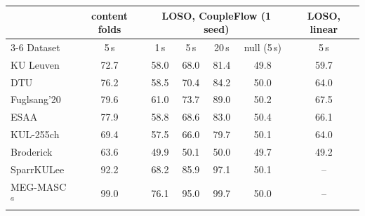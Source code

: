 \begin{tabular}{lcccccc}\toprule
& content folds & \multicolumn{4}{c}{LOSO, CoupleFlow (1 seed)} & LOSO, linear \\
\cmidrule(lr){3-6}
Dataset & 5\,s & 1\,s & 5\,s & 20\,s & null (5\,s) & 5\,s \\\midrule
KU Leuven & 72.7 & 58.0 & 68.0 & 81.4 & 49.8 & 59.7 \\
DTU & 76.2 & 58.5 & 70.4 & 84.2 & 50.0 & 64.0 \\
Fuglsang'20 & 79.6 & 61.0 & 73.7 & 89.0 & 50.2 & 67.5 \\
ESAA & 77.9 & 58.8 & 68.6 & 83.0 & 50.4 & 66.1 \\
KUL-255ch & 69.4 & 57.5 & 66.0 & 79.7 & 50.1 & 64.0 \\
Broderick & 63.6 & 49.9 & 50.1 & 50.0 & 49.7 & 49.2 \\
SparrKULee & 92.2 & 68.2 & 85.9 & 97.1 & 50.1 & -- \\
MEG-MASC$^a$ & 99.0 & 76.1 & 95.0 & 99.7 & 50.0 & -- \\
\bottomrule\end{tabular}
